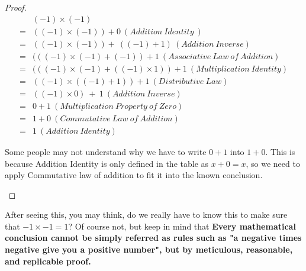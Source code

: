         \begin{proof}
            \begin{align*}
                 & ( -1) \times ( -1)\\
                = & (( -1) \times ( -1)) +0\ ( Addition\ Identity\ )\\
                = & (( -1) \times ( -1)) +\ (( -1) +1) \ ( Addition\ Inverse)\\
                = & ((( -1) \times ( -1) +( -1)) +1\ ( Associative\ Law\ of\ Addition)\\
                = & ((( -1) \times ( -1) +(( -1) \times 1)) +1\ ( Multiplication\ Identity)\\
                = & (( -1) \times (( -1) +1)) +1\ ( Distributive\ Law)\\
                = & (( -1) \times 0) \ +\ 1\ ( Addition\ Inverse)\\
                = & 0+1\ ( Multiplication\ Property\ of\ Zero)\\
                = & 1+0\ (Commutative\ Law\ of\ Addition)\\
                = & 1\ ( Addition\ Identity)
            \end{align*}
            \begin{remark}
                Some people may not understand why we have to write $0+1$ into $1+0$. This is because
                Addition Identity is only defined in the table as $x+0=x$, so we need to apply Commutative
                law of addition to fit it into the known conclusion.
            \end{remark}
        \end{proof}

        After seeing this, you may think, do we really have to know this to make sure that $-1\times-1=1$?
        Of course not, but keep in mind that \textbf{Every mathematical conclusion cannot be simply referred as
        rules such as "a negative times negative give you a positive number", but by meticulous, reasonable, and 
        replicable proof.}

